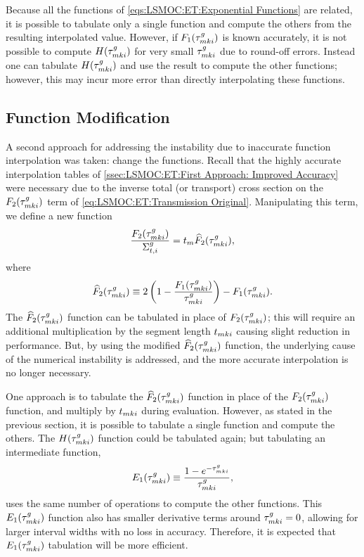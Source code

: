 {{{{        Because all the functions of \cref{eqs:LSMOC:ET:Exponential Functions} are related, it is possible to tabulate only a single function and compute the others from the resulting interpolated value.
        However, if $F_1(\segopt)$ is known accurately, it is not possible to compute $H(\segopt)$ for very small $\segopt$ due to round-off errors.
        Instead one can tabulate $H(\segopt)$ and use the result to compute the other functions; however, this may incur more error than directly interpolating these functions.
      }
    }
    \subsection{Function Modification}{\label{ssec:LSMOC:ET:Function Modification}
      A second approach for addressing the instability due to inaccurate function interpolation was taken: change the functions.
      Recall that the highly accurate interpolation tables of \cref{ssec:LSMOC:ET:First Approach: Improved Accuracy} were necessary due to the inverse total (or transport) cross section on the $F_2(\segopt)$ term of \cref{eq:LSMOC:ET:Transmission Original}.
      Manipulating this term, we define a new function
      \begin{equation}\label{eq:LSMOC:ET:F2 Modified Definition}
        \frac{F_2(\segopt)}{\xst} = \nlen\modFunc,
      \end{equation}
      where
      \begin{equation}\label{eq:LSMOC:ET:F2 Modified}
        \modFunc \defined 2\left(1-\frac{F_1(\segopt)}{\segopt}\right) - F_1(\segopt).
      \end{equation}
      The $\modFunc$ function can be tabulated in place of $F_2(\segopt)$; this will require an additional multiplication by the segment length $\nsegl$ causing slight reduction in performance.
      But, by using the modified $\modFunc$ function, the underlying cause of the numerical instability is addressed, and the more accurate interpolation is no longer necessary.

      One approach is to tabulate the $\modFunc$ function in place of the $F_2(\segopt)$ function, and multiply by $\nsegl$ during evaluation.
      However, as stated in the previous section, it is possible to tabulate a single function and compute the others.
      The $H(\segopt)$ function could be tabulated again; but tabulating an intermediate function,
      \begin{equation}\label{eq:LSMOC:ET:E1}
        E_1(\segopt) \defined \frac{1-e^{-\segopt}}{\segopt},
      \end{equation}
      uses the same number of operations to compute the other functions.
      This $E_1(\segopt)$ function also has smaller derivative terms around $\segopt=0$, allowing for larger interval widths with no loss in accuracy.
      Therefore, it is expected that $E_1(\segopt)$ tabulation will be more efficient.
    }
}}
